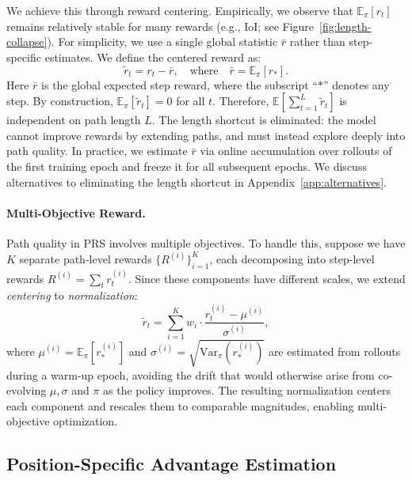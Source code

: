 \documentclass{llmxive}
\begin{document}
We achieve this through reward centering. Empirically, we observe that $\mathbb{E}_{\pi}[r_t]$ remains relatively stable for many rewards (e.g., IoI; see Figure~\ref{fig:length-collapse}). For simplicity, we use a single global statistic $\bar{r}$ rather than 
step-specific estimates. We define the centered reward as: 
\begin{equation}
\tilde{r}_t = r_t - \bar{r}, \quad \text{where} \quad \bar{r} = \mathbb{E}_{\pi}\left[r_*\right].
\label{eq:centering}
\end{equation}
Here $\bar{r}$ is the global expected step reward, where the subscript ``$*$'' denotes any step. By construction, $\mathbb{E}_{\pi}[\tilde{r}_t] = 0$ for all $t$. Therefore, $\mathbb{E}\left[\sum_{t=1}^{L} \tilde{r}_t\right]$ is independent on path length $L$. The length shortcut is eliminated: the model cannot improve rewards by extending paths, and must instead explore deeply into path quality. In practice, we estimate $\bar{r}$ via online accumulation over rollouts of the first training epoch and freeze it for all subsequent epochs. We discuss alternatives to eliminating the length shortcut in Appendix~\ref{app:alternatives}.

\paragraph{Multi-Objective Reward.} Path quality in PRS involves multiple objectives. To handle this, suppose we have $K$ separate path-level rewards $\{R^{(i)}\}_{i=1}^{K}$, each decomposing into step-level rewards $R^{(i)}=\sum_t r_t^{(i)}$. Since these components have different scales, we extend \emph{centering} to \emph{normalization}:
\begin{equation}
\tilde{r}_t = \sum_{i=1}^{K} w_i \cdot \frac{r_t^{(i)} - \mu^{(i)}}{\sigma^{(i)}},
\label{eq:reward-normalize}
\end{equation}
where $\mu^{(i)} = \mathbb{E}_{\pi}\left[r_*^{(i)}\right]$ and $\sigma^{(i)} = \sqrt{\mathrm{Var}_{\pi}\left(r_*^{(i)}\right)}$ are estimated from rollouts during a warm-up epoch, avoiding the drift that would otherwise arise from co-evolving $\mu, \sigma$ and $\pi$ as the policy improves. The resulting normalization centers each component and rescales them to comparable magnitudes, enabling multi-objective optimization.

\subsection{Position-Specific Advantage Estimation}
\label{sec:advantage}
\end{document}
